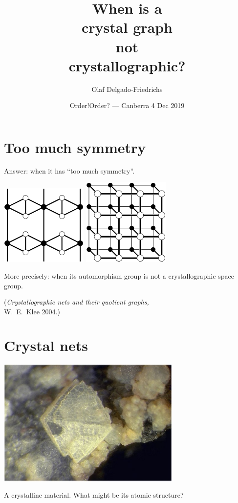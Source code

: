 \documentclass{beamer}
\title{When is a\\ crystal graph\\ not\\ crystallographic?}
\author[Olaf Delgado]{Olaf Delgado-Friedrichs}
\date{Order!Order? --- Canberra 4 Dec 2019}
\begin{document}
\begin{frame}
  \titlepage
\end{frame}


\section{Too much symmetry}

\begin{frame}
  \begin{center}
    Answer: when it has ``too much symmetry''.

    \includegraphics[width=1.7in]{unstable}
    \qquad
    \includegraphics[width=1.7in]{ladder}

    More precisely: when its automorphism group is not a crystallographic
    space group.

    ({\em Crystallographic nets and their quotient graphs,}\\
    W.\ E.\ Klee 2004.)
  \end{center}
\end{frame}


\section{Crystal nets}

\begin{frame}
  \begin{center}
    \includegraphics[height=2.5in]{fau-photo}

    A crystalline material.  What might be its atomic structure?
  \end{center}
\end{frame}
\end{document}
